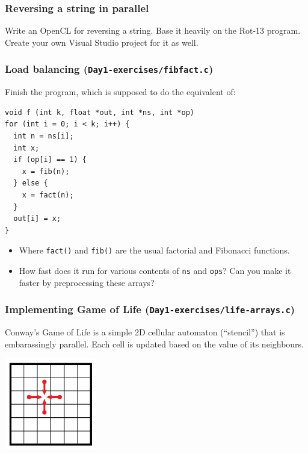 \documentclass{beamer}
\begin{document}
\begin{frame}
  \frametitle{Reversing a string in parallel}

  Write an OpenCL for reversing a string.  Base it heavily on the
  Rot-13 program.  Create your own Visual Studio project for it as
  well.
\end{frame}

\begin{frame}[fragile]
  \frametitle{Load balancing (\texttt{Day1-exercises/fibfact.c})}

  Finish the program, which is supposed to do the equivalent of:

\begin{lstlisting}
void f (int k, float *out, int *ns, int *op)
for (int i = 0; i < k; i++) {
  int n = ns[i];
  int x;
  if (op[i] == 1) {
    x = fib(n);
  } else {
    x = fact(n);
  }
  out[i] = x;
}
\end{lstlisting}

  \begin{itemize}
  \item Where \texttt{fact()} and \texttt{fib()} are the usual
    factorial and Fibonacci functions.
  \item How fast does it run for various contents of \texttt{ns} and
    \texttt{ops}?  Can you make it faster by preprocessing these
    arrays?
  \end{itemize}

\end{frame}

\begin{frame}
  \frametitle{Implementing Game of Life (\texttt{Day1-exercises/life-arrays.c})}

  Conway's Game of Life is a simple 2D cellular automaton
  (``stencil'') that is embarassingly parallel.  Each cell is updated
  based on the value of its neighbours.

  \begin{center}
    \includegraphics[width=4cm]{img/stencil.png}
  \end{center}

\end{frame}
\end{document}
